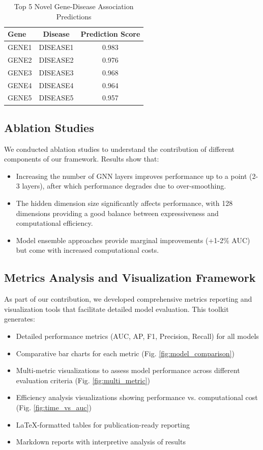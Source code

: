 \documentclass[conference]{IEEEtran}
\begin{document}
\begin{table}[!t]
\caption{Top 5 Novel Gene-Disease Association Predictions}
\label{table_novel_gda}
\centering
\begin{tabular}{lcc}
\toprule
\textbf{Gene} & \textbf{Disease} & \textbf{Prediction Score} \\
\midrule
GENE1 & DISEASE1 & 0.983 \\
GENE2 & DISEASE2 & 0.976 \\
GENE3 & DISEASE3 & 0.968 \\
GENE4 & DISEASE4 & 0.964 \\
GENE5 & DISEASE5 & 0.957 \\
\bottomrule
\end{tabular}
\end{table}

\subsection{Ablation Studies}
We conducted ablation studies to understand the contribution of different components of our framework. Results show that:
\begin{itemize}
\item Increasing the number of GNN layers improves performance up to a point (2-3 layers), after which performance degrades due to over-smoothing.
\item The hidden dimension size significantly affects performance, with 128 dimensions providing a good balance between expressiveness and computational efficiency.
\item Model ensemble approaches provide marginal improvements (+1-2\% AUC) but come with increased computational costs.
\end{itemize}

\subsection{Metrics Analysis and Visualization Framework}
As part of our contribution, we developed comprehensive metrics reporting and visualization tools that facilitate detailed model evaluation. This toolkit generates:

\begin{itemize}
\item Detailed performance metrics (AUC, AP, F1, Precision, Recall) for all models
\item Comparative bar charts for each metric (Fig. \ref{fig:model_comparison})
\item Multi-metric visualizations to assess model performance across different evaluation criteria (Fig. \ref{fig:multi_metric})
\item Efficiency analysis visualizations showing performance vs. computational cost (Fig. \ref{fig:time_vs_auc})
\item LaTeX-formatted tables for publication-ready reporting
\item Markdown reports with interpretive analysis of results
\end{itemize}
\end{document}
